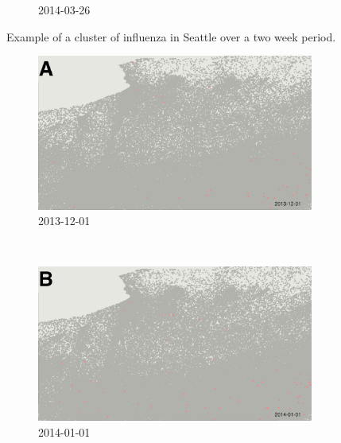 \begin{figure}
\begin{subfigure}[b]{0.6\textwidth}
        \caption*{2014-03-26}
    \end{subfigure}
    \caption{Example of a cluster of influenza in Seattle over a two week period.}\label{fig:seattle}
\end{figure}

\begin{figure}
    \centering
    \begin{subfigure}[b]{0.6\textwidth}
        \includegraphics[width=\textwidth]{longitude/figs/visual/pa0.png}
        \caption*{2013-12-01}
    \end{subfigure}
    ~ %
    \begin{subfigure}[b]{0.6\textwidth}
        \includegraphics[width=\textwidth]{longitude/figs/visual/pa1.png}
        \caption*{2014-01-01}
    \end{subfigure}
    ~ %
    \begin{subfigure}[b]{0.6\textwidth}

\end{subfigure}
\end{figure}
